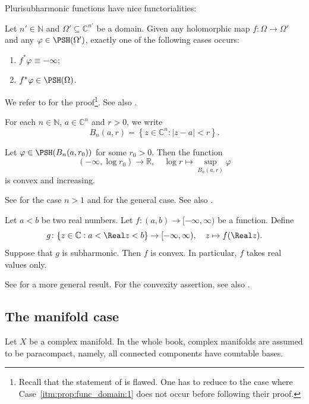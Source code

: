 Plurisubharmonic functions have nice functorialities:
\begin{proposition}\label{prop:func_domain}
    Let $n'\in \mathbb{N}$ and $\Omega'\subseteq \mathbb{C}^{n'}$ be a domain. Given any holomorphic map $f\colon \Omega\rightarrow \Omega'$ and any $\varphi\in \PSH(\Omega')$, exactly one of the following cases occurs:
    \begin{enumerate}
        \item\label{itm:prop:func_domain:1} $f^*\varphi\equiv -\infty$;
        \item\label{itm:prop:func_domain:2} $f^*\varphi\in \PSH(\Omega)$.
    \end{enumerate}
\end{proposition}
We refer to \cite[Proposition~1.44]{GZ17} for the proof\footnote{Recall that the statement of \cite[Proposition~1.44]{GZ17} is flawed. One has to reduce to the case where Case~\ref{itm:prop:func_domain:1} does not occur before following their proof.}. See also \cite[Proposition~8.2.3]{FPT}.

For each $n\in \mathbb{N}$, $a\in \mathbb{C}^n$ and $r>0$, we write
\begin{equation}\label{eq:Bnar}
B_n(a,r)=\left\{ z\in \mathbb{C}^n: |z-a|<r \right\}.
\end{equation}
\begin{proposition}\label{prop:ballpshconvex}
    Let $\varphi\in \PSH(B_n(a,r_0))$ for some $r_0>0$. Then the function
    \[
    (-\infty,\log r_0)\rightarrow \mathbb{R},\quad \log r\mapsto \sup_{B_n(a,r)}\varphi
    \]
    is convex and increasing.
\end{proposition}
See \cite[Theorem~4.1.13]{Hor07} for the case $n>1$ and \cite[Corollary~2.4]{Bou17} for the general case. See also \cite[Proposition~12.1.1]{FPT}.

\begin{proposition}\label{prop:subhimplyconv}
Let $a<b$ be two real numbers.
    Let $f\colon (a,b)\rightarrow [-\infty,\infty)$ be a function. Define
    \[
    g\colon \{z\in \mathbb{C}:a<\Real z<b\}\rightarrow [-\infty,\infty),\quad z\mapsto f(\Real z).
    \]
    Suppose that $g$ is subharmonic. Then $f$ is convex. In particular, $f$ takes real values only.
\end{proposition}

See \cite[Theorem~2.12]{HK76} for a more general result. For the convexity assertion, see also \cite[Proposition~18.1.5]{FPT}.

\subsection{The manifold case}
\label{subsec:psh_manifold}
Let $X$ be a complex manifold. In the whole book, complex manifolds are assumed to be paracompact, namely, all connected components have countable bases.


